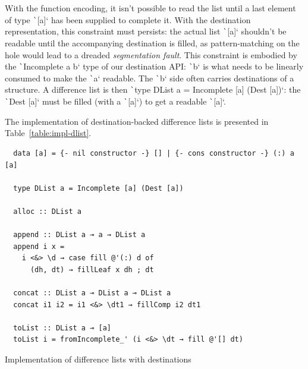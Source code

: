 \documentclass[english]{jflart}
\begin{document}
With the function encoding, it isn't possible to read the list until a last element of type \texttt`[a]` has been supplied to complete it. With the destination representation, this constraint must persists: the actual list \texttt`[a]` shouldn't be readable until the accompanying destination is filled, as pattern-matching on the hole would lead to a dreaded \emph{segmentation fault}. This constraint is embodied by the \texttt`Incomplete a b` type of our destination API: \texttt`b` is what needs to be linearly consumed to make the \texttt`a` readable. The \texttt`b` side often carries destinations of a structure. A difference list is then \texttt`type DList a = Incomplete [a] (Dest [a])`: the \texttt`Dest [a]` must be filled (with a \texttt`[a]`) to get a readable \texttt`[a]`.

The implementation of destination-backed difference lists is presented in Table~\ref{table:impl-dlist}.


\begin{table}[p]
  \small
  \begin{verbatim}
  data [a] = {- nil constructor -} [] | {- cons constructor -} (:) a [a]
  
  type DList a = Incomplete [a] (Dest [a])
  
  alloc :: DList a
  
  append :: DList a ⊸ a → DList a
  append i x =
    i <&> \d → case fill @'(:) d of
      (dh, dt) → fillLeaf x dh ; dt
  
  concat :: DList a ⊸ DList a ⊸ DList a
  concat i1 i2 = i1 <&> \dt1 → fillComp i2 dt1
  
  toList :: DList a ⊸ [a]
  toList i = fromIncomplete_' (i <&> \dt → fill @'[] dt)
  \end{verbatim}
  \caption{Implementation of difference lists with destinations}
  \label{table:impl-dlist}
  \end{table}
\end{document}
